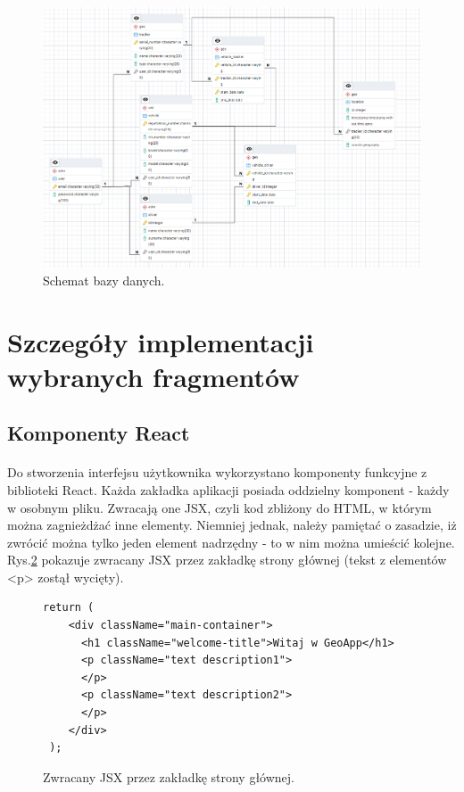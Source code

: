 \begin{figure}
	\centering
	\includegraphics[width=1\textwidth]{./graf/database.png}
	\caption{Schemat bazy danych.}
	\label{fig:database}
\end{figure}

\section{Szczegóły implementacji wybranych fragmentów}

\subsection{Komponenty React}
\paragraph{}
Do stworzenia interfejsu użytkownika wykorzystano komponenty funkcyjne z biblioteki React. Każda zakładka aplikacji posiada oddzielny komponent - każdy w osobnym pliku. Zwracają one JSX, czyli kod zbliżony do HTML, w którym można zagnieżdżać inne elementy. Niemniej jednak, należy pamiętać o zasadzie, iż zwrócić można tylko jeden element nadrzędny - to w nim można umieścić kolejne. Rys.\ref{fig:kod:jsx} pokazuje zwracany JSX przez zakładkę strony głównej (tekst z elementów <p> zostął wycięty).

\begin{figure}
\centering
\begin{lstlisting}
return (
    <div className="main-container">
      <h1 className="welcome-title">Witaj w GeoApp</h1>
      <p className="text description1">
      </p>
      <p className="text description2">
      </p>
    </div>
 );
\end{lstlisting}
\caption{Zwracany JSX przez zakładkę strony głównej.}
\label{fig:kod:jsx}
\end{figure}


